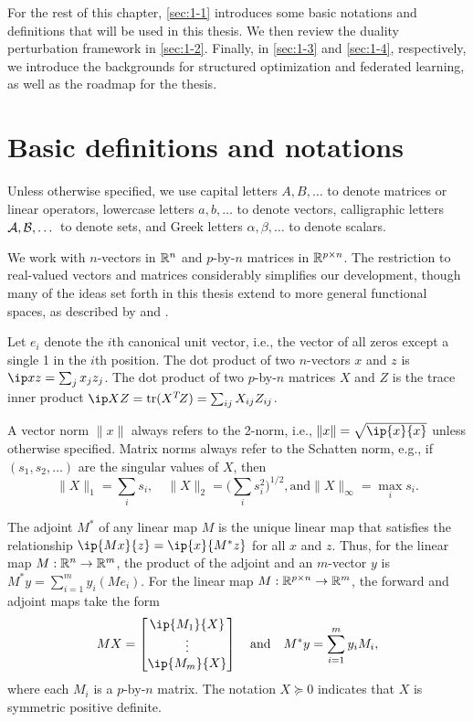 For the rest of this chapter, \autoref{sec:1-1} introduces some basic notations and definitions that will be used in this thesis. We then review the duality perturbation framework in \autoref{sec:1-2}. Finally, in \autoref{sec:1-3} and \autoref{sec:1-4}, respectively, we introduce the backgrounds for structured optimization and federated learning, as well as the roadmap for the thesis. 

  

\section{Basic definitions and notations} \label{sec:1-1}

Unless otherwise specified, we use capital letters $A, B, \dots$ to denote matrices or linear operators, lowercase letters $a, b, \dots$ to denote vectors, calligraphic letters $\mathcal{A}, \mathcal{B}, \dots$ to denote sets, and Greek letters $\alpha, \beta, \dots$ to denote scalars.

We work with $n$-vectors in $\mathbb{R}^n$ and $p$-by-$n$ matrices in $\mathbb{R}^{p\times
n}$. The restriction to real-valued vectors and matrices considerably simplifies
our development, though many of the ideas set forth in this thesis extend to
more general functional spaces, as described by \citet{zalinescu2002convex} and
\citet{bauschke2011convex}.

Let $e_i$ denote the $i$th canonical unit vector, i.e., the vector of all zeros
except a single 1 in the $i$th position. The dot product of two $n$-vectors $x$
and $z$ is $\ip x z = \sum_{j} x_j z_j$. The dot product of two $p$-by-$n$
matrices $X$ and $Z$ is the trace inner product $\ip X Z = \trace(X\T Z) =
\sum_{ij}X_{ij}Z_{ij}$.

A vector norm $\|x\|$ always refers to the 2-norm, i.e., $\|x\| = \sqrt{\ip{x}{x}}$ unless otherwise specified. Matrix norms always refer to the Schatten norm, e.g., if $(s_1, s_2,\ldots)$ are
the singular values of $X$, then
\[
  \|X\|_1 = \sum_i s_i,
  \quad \|X\|_2=\Big(\sum_i s_i^2\Big)^{1/2},
  \text{and} \|X\|_\infty=\max_i s_i.
\]

The adjoint $M^*$ of any linear map $M$ is the unique
linear map that satisfies the relationship $\ip{Mx}{z}=\ip{x}{M^*z}$ for all $x$ and $z$. Thus, for
the linear map $M:\mathbb{R}^n\to\mathbb{R}^m$, the product of the adjoint and an
$m$-vector $y$ is $M^*y = \sum_{i=1}^m y_i (Me_i)$. For the linear map
$M:\mathbb{R}^{p\times n}\to\mathbb{R}^m$, the forward and adjoint maps take the form
\begin{equation} \label{eq:mat-map}
  M X = \begin{bmatrix}
    \ip{M_1}{X} \\ \vdots \\ \ip{M_m}{X}
  \end{bmatrix}  
  \quad\mbox{and}\quad
  M^*y = \sum_{i=1}^m y_i M_i,
\end{equation}
where each $M_i$ is a $p$-by-$n$ matrix. The notation $X\succeq0$
indicates that $X$ is symmetric positive definite.

